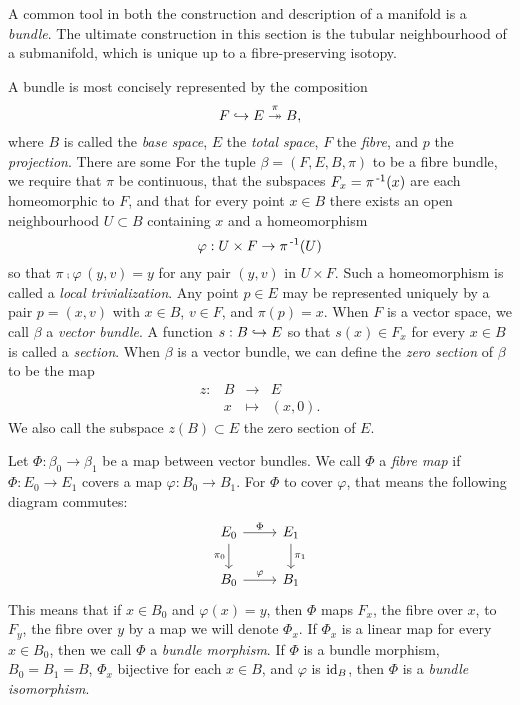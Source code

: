 A common tool in both the construction and description of a manifold is a \emph{bundle}.
The ultimate construction in this section is the tubular neighbourhood of a submanifold, which is unique up to a fibre-preserving isotopy.

\begin{defn}[Bundles]
	A bundle is most concisely represented by the composition
	\[
		F\hookrightarrow E\overset{\pi}{\twoheadrightarrow} B,
	\]
	where $B$ is called the \emph{base space}, $E$ the \emph{total space}, $F$ the \emph{fibre}, and $p$ the \emph{projection}.
	There are some 
	For the tuple $\beta = (F,E,B,\pi)$ to be a fibre bundle, we require that $\pi$ be continuous, that the subspaces $F_x = \pi^{\,\text{-}1}(x)$ are each homeomorphic to $F$, and that for every point $x\in B$ there exists an open neighbourhood $U\subset B$ containing $x$ and a homeomorphism
	\[
		\varphi: U\times F\to \pi^{\,\text{-}1}(U)
	\]
	so that $\pi\comp\varphi\,(y,v)=y$ for any pair $(y,v)$ in $U\times F$.
	Such a homeomorphism is called a \emph{local trivialization}.
	Any point $p\in E$ may be represented uniquely by a pair $p=(x,v)$ with $x\in B$, $v\in F$, and $\pi(p)=x$.
	When $F$ is a vector space, we call $\beta$ a \emph{vector bundle}.
	A function $s:B\hookrightarrow E$ so that $s(x)\in F_x$ for every $x\in B$ is called a \emph{section}.
	When $\beta$ is a vector bundle, we can define the \emph{zero section} of $\beta$ to be the map
	\[
		\begin{array}{cccc}
			z: & B & \to 	 & E \\
			   & x & \mapsto & (x,0).
		\end{array}
	\]
	We also call the subspace $z(B)\subset E$ the zero section of $E$.
\end{defn}

\begin{defn}
	Let $\Phi:\beta_0\to \beta_1$ be a map between vector bundles.
	We call $\Phi$ a \emph{fibre map} if $\Phi:E_0\to E_1$ covers a map $\varphi:B_0\to B_1$.
	For $\Phi$ to cover $\varphi$, that means the following diagram commutes:
	\[
		\begin{tikzcd}
			E_0 \arrow{r}{\Phi} \arrow[swap]{d}{\pi_0} & E_1 \arrow{d}{\pi_1} \\
			B_0 \arrow{r}{\varphi} & B_1
		\end{tikzcd}
	\]
	This means that if $x\in B_0$ and $\varphi(x)=y$, then $\Phi$ maps $F_x$, the fibre over $x$, to $F_y$, the fibre over $y$ by a map we will denote $\Phi_x$.
	If $\Phi_x$ is a linear map for every $x\in B_0$, then we call $\Phi$ a \emph{bundle morphism}.
	If $\Phi$ is a bundle morphism, $B_0=B_1=B$, $\Phi_x$ bijective for each $x\in B$, and $\varphi$ is $\textrm{id}_{B}$, then $\Phi$ is a \emph{bundle isomorphism}.
\end{defn}

